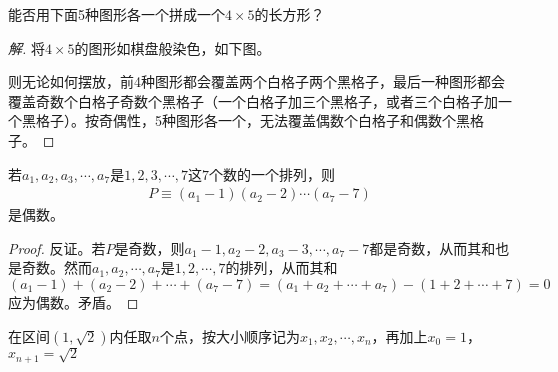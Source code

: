 \begin{example}
  能否用下面5种图形各一个拼成一个$4\times5$的长方形？

  \centering
\end{example}
\begin{proof}[解]
  将$4\times5$的图形如棋盘般染色，如下图。
  \begin{center}
  \end{center}
  则无论如何摆放，前4种图形都会覆盖两个白格子两个黑格子，最后一种图形都会覆盖奇数个白格子奇数个黑格子（一个白格子加三个黑格子，或者三个白格子加一个黑格子）。按奇偶性，5种图形各一个，无法覆盖偶数个白格子和偶数个黑格子。
\end{proof}

\begin{example}
  若$a_1,a_2,a_3,\cdots,a_7$是$1,2,3,\cdots,7$这$7$个数的一个排列，则
  \begin{align*}
    P\equiv (a_1 - 1)(a_2-2)\cdots(a_7-7)
  \end{align*}
  是偶数。
\end{example}
\begin{proof}
  反证。若$P$是奇数，则$a_1-1, a_2-2, a_3-3,\cdots, a_7-7$都是奇数，从而其和也是奇数。然而$a_1,a_2,\cdots,a_7$是$1,2,\cdots,7$的排列，从而其和$(a_1-1) + (a_2-2) + \cdots + (a_7-7)=(a_1+a_2+\cdots + a_7)-(1+2+\cdots+7)=0$应为偶数。矛盾。
\end{proof}

\begin{example}
  在区间$(1,\sqrt2)$内任取$n$个点，按大小顺序记为$x_1,x_2,\cdots,x_n$，再加上$x_0=1$，$x_{n+1}=\sqrt2$
\end{example}